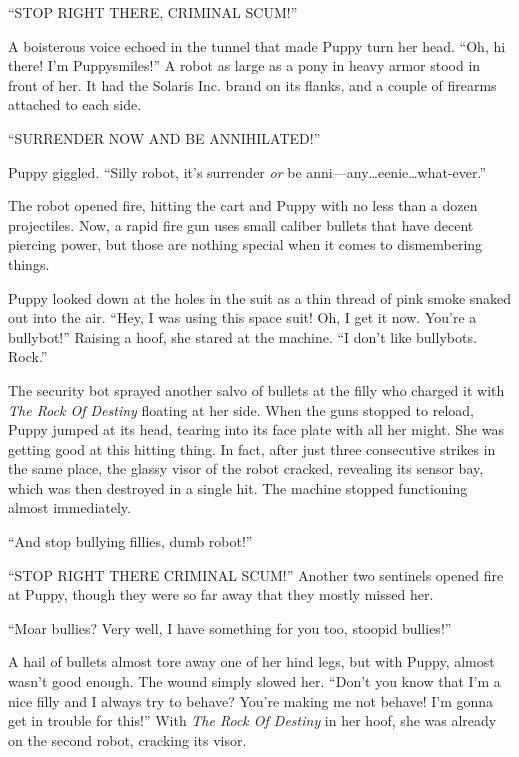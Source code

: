 ``STOP RIGHT THERE, CRIMINAL SCUM!''

A boisterous voice echoed in the tunnel that made Puppy turn her head. ``Oh, hi there! I'm Puppysmiles!'' A robot as large as a pony in heavy armor stood in front of her. It had the Solaris Inc. brand on its flanks, and a couple of firearms attached to each side.

``SURRENDER NOW AND BE ANNIHILATED!''


Puppy giggled. ``Silly robot, it's surrender \emph{or} be anni---any\dots eenie\dots what-ever.''


The robot opened fire, hitting the cart and Puppy with no less than a dozen projectiles. Now, a rapid fire gun uses small caliber bullets that have decent piercing power, but those are nothing special when it comes to dismembering things.

Puppy looked down at the holes in the suit as a thin thread of pink smoke snaked out into the air. ``Hey, I was using this space suit! Oh, I get it now. You're a bullybot!'' Raising a hoof, she stared at the machine. ``I don't like bullybots. Rock.''

The security bot sprayed another salvo of bullets at the filly who charged it with \emph{The Rock Of Destiny} floating at her side. When the guns stopped to reload, Puppy jumped at its head, tearing into its face plate with all her might. She was getting good at this hitting thing. In fact, after just three consecutive strikes in the same place, the glassy visor of the robot cracked, revealing its sensor bay, which was then destroyed in a single hit. The machine stopped functioning almost immediately.

``And stop bullying fillies, dumb robot!''

``STOP RIGHT THERE CRIMINAL SCUM!'' Another two sentinels opened fire at Puppy, though they were so far away that they mostly missed her.

``Moar bullies? Very well, I have something for you too, stoopid bullies!''

A hail of bullets almost tore away one of her hind legs, but with Puppy, almost wasn't good enough. The wound simply slowed her. ``Don't you know that I'm a nice filly and I always try to behave? You're making me not behave! I'm gonna get in trouble for this!'' With \emph{The Rock Of Destiny} in her hoof, she was already on the second robot, cracking its visor.

